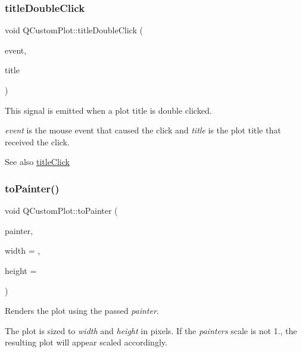 \subsubsection{\texorpdfstring{title\+Double\+Click}{titleDoubleClick}}
{\footnotesize\ttfamily void Q\+Custom\+Plot\+::title\+Double\+Click (\begin{DoxyParamCaption}\item[{Q\+Mouse\+Event $\ast$}]{event,  }\item[{\mbox{\hyperlink{class_q_c_p_plot_title}{Q\+C\+P\+Plot\+Title}} $\ast$}]{title }\end{DoxyParamCaption})\hspace{0.3cm}{\ttfamily [signal]}}

This signal is emitted when a plot title is double clicked.

{\itshape event} is the mouse event that caused the click and {\itshape title} is the plot title that received the click.

\begin{DoxySeeAlso}{See also}
\mbox{\hyperlink{class_q_custom_plot_a2137a819e518fee7edd1c0bf5984d8d6}{title\+Click}} 
\end{DoxySeeAlso}
\mbox{\label{class_q_custom_plot_a1be68d5c0f1e086d6374d1340a193fb9}} 
\subsubsection{\texorpdfstring{to\+Painter()}{toPainter()}}
{\footnotesize\ttfamily void Q\+Custom\+Plot\+::to\+Painter (\begin{DoxyParamCaption}\item[{\mbox{\hyperlink{class_q_c_p_painter}{Q\+C\+P\+Painter}} $\ast$}]{painter,  }\item[{int}]{width = {},  }\item[{int}]{height = {} }\end{DoxyParamCaption})}

Renders the plot using the passed {\itshape painter}.

The plot is sized to {\itshape width} and {\itshape height} in pixels. If the {\itshape painter\textquotesingle{}s} scale is not 1., the resulting plot will appear scaled accordingly.


